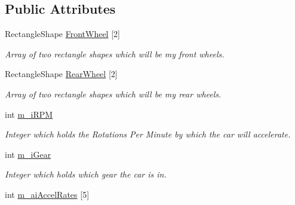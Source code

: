 \subsection*{Public Attributes}
\begin{DoxyCompactItemize}
\item 
\hypertarget{class_car_a46612ea1666db7c7332fe2d23d731a12}{}Rectangle\+Shape \hyperlink{class_car_a46612ea1666db7c7332fe2d23d731a12}{Front\+Wheel} \mbox{[}2\mbox{]}\label{class_car_a46612ea1666db7c7332fe2d23d731a12}

\begin{DoxyCompactList}\small\item\em Array of two rectangle shapes which will be my front wheels. \end{DoxyCompactList}\item 
\hypertarget{class_car_af8c8ae2d2e022338d13bce2eb4fed1e2}{}Rectangle\+Shape \hyperlink{class_car_af8c8ae2d2e022338d13bce2eb4fed1e2}{Rear\+Wheel} \mbox{[}2\mbox{]}\label{class_car_af8c8ae2d2e022338d13bce2eb4fed1e2}

\begin{DoxyCompactList}\small\item\em Array of two rectangle shapes which will be my rear wheels. \end{DoxyCompactList}\item 
\hypertarget{class_car_a4d453c99f080df6d44f0f44eaa5d24e1}{}int \hyperlink{class_car_a4d453c99f080df6d44f0f44eaa5d24e1}{m\+\_\+i\+R\+P\+M}\label{class_car_a4d453c99f080df6d44f0f44eaa5d24e1}

\begin{DoxyCompactList}\small\item\em Integer which holds the Rotations Per Minute by which the car will accelerate. \end{DoxyCompactList}\item 
\hypertarget{class_car_aa05d717a7339d5c9fc6fc420fec7041d}{}int \hyperlink{class_car_aa05d717a7339d5c9fc6fc420fec7041d}{m\+\_\+i\+Gear}\label{class_car_aa05d717a7339d5c9fc6fc420fec7041d}

\begin{DoxyCompactList}\small\item\em Integer which holds which gear the car is in. \end{DoxyCompactList}\item 
\hypertarget{class_car_a42b2cb593b38ebbf22733931740b68cc}{}int \hyperlink{class_car_a42b2cb593b38ebbf22733931740b68cc}{m\+\_\+ai\+Accel\+Rates} \mbox{[}5\mbox{]}\label{class_car_a42b2cb593b38ebbf22733931740b68cc}


\end{DoxyCompactItemize}
